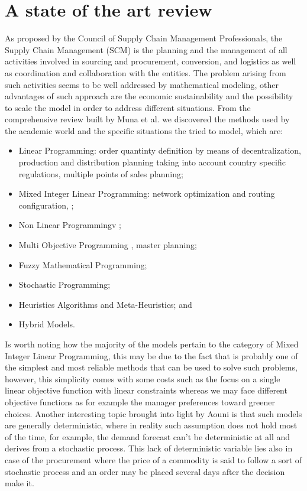 \documentclass{article}
\begin{document}
\section{A state of the art review }
  As proposed by the Council of Supply Chain Management Professionals, the Supply Chain Management (SCM) is the planning and the management of all activities involved in sourcing and procurement, conversion, and logistics as well as coordination and collaboration with the entities. The problem arising from such activities seems to be well addressed by mathematical modeling, other advantages of such approach are the economic sustainability and the possibility to scale the model in order to address different situations.
  From the comprehensive review built by Muna et al. \cite{mula_mathematical_2010} we discovered the methods used by the academic world and the specific situations the tried to model, which are:
  \begin{itemize}
	  \item Linear Programming: order quantinty definition by means of decentralization\cite{jung_order_2008}, production and distribution planning taking into account country specific regulations\cite{Oh_Karimi_2006}, multiple points of sales planning\cite{Kanyalkar_2005};
	  \item Mixed Integer Linear Programming: network optimization and routing configuration\cite{romo_optimizing_2009}, \cite{Rizk_Martel2008};
    \item Non Linear Programmingv \cite{benjamin_analysis_1989};
    \item Multi Objective Programming \cite{torabi_interactive_2008}, master planning\cite{Chern_Hsieh_2007};
    \item Fuzzy Mathematical Programming;
    \item Stochastic Programming;
    \item Heuristics Algorithms and Meta-Heuristics; and
    \item Hybrid Models.
  \end{itemize}

  Is worth noting how the majority of the models pertain to the category of Mixed Integer Linear Programming, this may be due to the fact that is probably one of the simplest and most reliable methods that can be used to solve such problems, however, this simplicity comes with some costs such as the focus on a single linear objective function with linear constraints whereas we may face different objective functions as for example the manager preferences toward greener choices. Another interesting topic brought into light by Aouni \cite{azimian_supply_2017} is that such models are generally deterministic, where in reality such assumption does not hold most of the time, for example, the demand forecast can't be deterministic at all and derives from a stochastic process. This lack of deterministic variable lies also in case of the procurement where the price of a commodity is said to follow a sort of stochastic process and an order may be placed several days after the decision make it.
\end{document}
